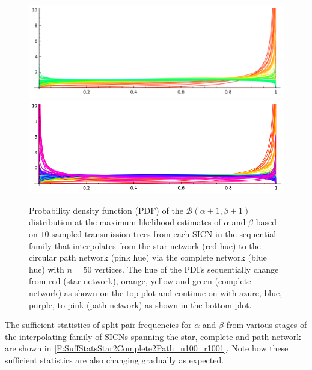 \documentclass[review]{elsarticle}
\numberwithin{equation}{section}
\let\orgautoref\autoref
\renewcommand{\autoref}
        {\def\equationautorefname{Eq.}%
         \def\figureautorefname{Fig.}%
         \def\subfigureautorefname{Fig.}%
         \def\sectionautorefname{Sect.}%
         \def\subsectionautorefname{Sect.}%
         \def\subsubsectionautorefname{Sect.}%
         \def\Itemautorefname{item}%
         \def\tableautorefname{Table}%
         \def\propositionautorefname{Prop.}%
         \def\corollaryautorefname{Corollary}%
         \def\theoremautorefname{Theorem}%
         \def\remarkautorefname{Remark}%
         \def\lemmaautorefname{Lemma}%
         \def\proofofautorefname{Proof}%
         \def\exampleautorefname{Example}%
         \orgautoref}
\begin{document}
\begin{figure}[htbp]
\includegraphics[width=0.95\linewidth]{figures/MLE_AandB_star2complete2path_n50_reps10_first.png}\\
\includegraphics[width=0.95\linewidth]{figures/MLE_AandB_star2complete2path_n50_reps10_last.png}
\caption{Probability density function (PDF) of the $\mathcal{B}(\alpha+1,\beta+1)$ distribution at the maximum likelihood estimates of $\alpha$ and $\beta$ based on $10$ sampled transmission trees from each SICN in the sequential family that interpolates from the star network (red hue) to the circular path network (pink hue) via the complete network (blue hue) with $n=50$ vertices. The hue of the PDFs sequentially change from red (star network), orange, yellow and green (complete network) as shown on the top plot and continue on with azure, blue, purple, to pink (path network) as shown in the bottom plot.\label{F:MLE_AandB_star2complete2path_n50_reps10_last}}
\end{figure}


The sufficient statistics of split-pair frequencies for $\alpha$ and $\beta$ from various stages of the interpolating family of SICNs spanning the star, complete and path network are shown in \autoref{F:SuffStatsStar2Complete2Path_n100_r1001}.  
Note how these sufficient statistics are also changing gradually as expected.
\end{document}
